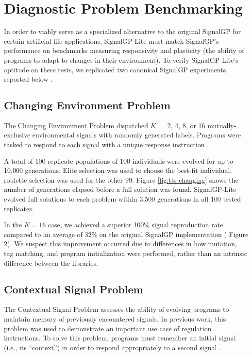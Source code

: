 \section{Diagnostic Problem Benchmarking}

In order to viably serve as a specialized alternative to the original SignalGP for certain artificial life applications, SignalGP-Lite must match SignalGP's performance on benchmarks measuring responsivity and plasticity (the ability of programs to adapt to changes in their environment).
To verify SignalGP-Lite's aptitude on these tests, we replicated two canonical SignalGP experiments, reported below \citep{lalejini2018evolving,lalejini_tag-based_2021}.

\subsection{Changing Environment Problem}



The Changing Environment Problem dispatched $K =$ 2, 4, 8, or 16 mutually-exclusive environmental signals with randomly generated labels.
Programs were tasked to respond to each signal with a unique response instruction \citep{lalejini2018evolving}.

A total of 100 replicate populations of 100 individuals were evolved for up to 10,000 generations.
Elite selection was used to choose the best-fit individual; roulette selection was used for the other 99.
Figure \ref{fig:tts-changing} shows the number of generations elapsed before a full solution was found.
SignalGP-Lite evolved full solutions to each problem within 3,500 generations in all 100 tested replicates.

In the $K=16$ case, we achieved a superior 100\% signal reproduction rate compared to an average of 32\% on the original SignalGP  implementation  (\citep{lalejini2018evolving} Figure 2).
We suspect this improvement occurred due to differences in how mutation, tag matching, and program initialization were performed, rather than an intrinsic difference between the libraries.

\subsection{Contextual Signal Problem}



The Contextual Signal Problem assesses the ability of evolving programs to maintain memory of previously encountered signals.
In previous work, this problem was used to demonstrate an important use case of regulation instructions.
To solve this problem, programs must remember an initial signal (i.e., its ``context'') in order to respond appropriately to a second signal \citep{lalejini_tag-based_2021}.

